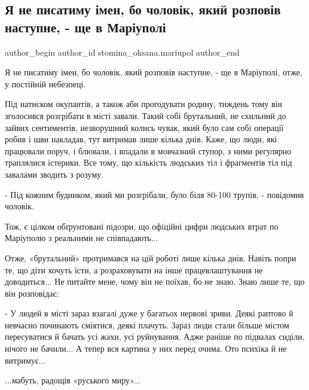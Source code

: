  
 
 
 
 

\subsection{Я не писатиму імен, бо чоловік, який розповів наступне,  - ще в Маріуполі}
\label{sec:06_05_2022.fb.stomina_oksana.mariupol.1.ya_ne_pisatimu__men_}

\ifcmt
 author_begin
   author_id stomina_oksana.mariupol
 author_end
\fi

Я не писатиму імен, бо  чоловік, який розповів наступне,  - ще в Маріуполі,
отже,  у постійній небезпеці. 

Під натиском окупантів, а також аби прогодувати родину, тиждень тому він
зголосився розгрібати в місті завали.  Такий собі брутальний, не схильний до
зайвих сентиментів, незворушний колись  чувак, який було сам собі операції
робив і шви накладав, тут витримав лише кілька днів. Каже, що люди, які
працювали поруч, і блювали, і впадали в мовчазний ступор, з ними регулярно
траплялися  істерики. Все тому, що кількість  людських тіл і  фрагментів тіл
під завалами зводить з розуму.

- Під кожним будинком, який ми розгрібали, було біля 80-100 трупів, - повідомив
чоловік.

Тож, є цілком обґрунтовані  підозри, що офіційні цифри людських втрат по
Маріуполю з реальними не співпадають...

Отже, «брутальний» протримався на цій роботі лише кілька днів. Навіть попри те,
що діти хочуть їсти, а розраховувати на інше працевлаштування не доводиться... Не
питайте мене, чому він не поїхав, бо не знаю. Знаю лише те, що він розповідає:

- У людей в місті зараз взагалі дуже у багатьох нервові зриви. Деякі раптово й
невчасно починають сміятися, деякі плачуть. Зараз люди стали більше містом
пересуватися й бачать усі жахи, усі руйнування. Адже раніше по підвалах сиділи,
нічого не бачили... А тепер вся картина у них перед очима. Ото психіка й не
витримує...

...мабуть, радощів «руського миру»...

